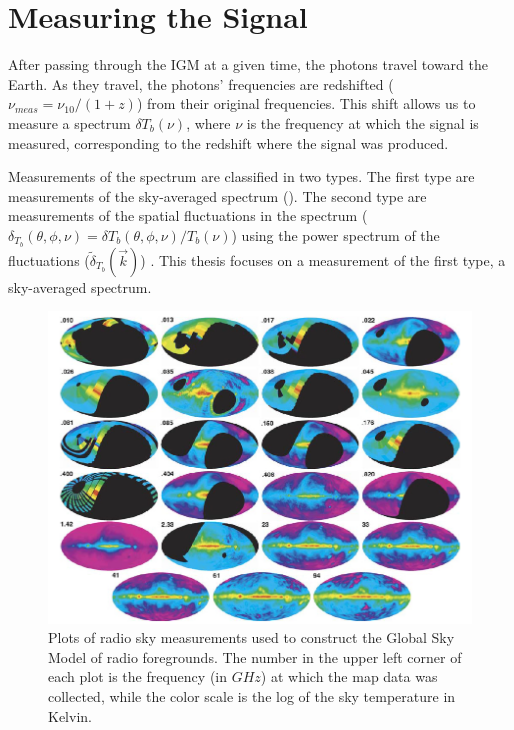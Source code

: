 \section{Measuring the \cm Signal}

After passing through the IGM at a given time, the \cm photons travel toward the Earth. As they travel, the photons' frequencies are redshifted ($\nu_{meas} = \nu_{10}/(1+z)$) from their original frequencies. This shift allows us to measure a spectrum $\delta T_b (\nu)$, where $\nu$ is the frequency at which the signal is measured, corresponding to the redshift where the signal was produced. 

Measurements of the \cm spectrum are classified in two types. The first type are measurements of the sky-averaged spectrum (\avgdtb). The second type are measurements of the spatial fluctuations in the \cm spectrum ($\delta_{T_b} (\theta, \phi, \nu) =  \delta T_b (\theta, \phi, \nu)/ T_b (\nu)$) using the power spectrum of the fluctuations ($ \tilde{\delta}_{T_b} ( \vec{k} )$) \cite{natarajan_2014}. This thesis focuses on a measurement of the first type, a sky-averaged spectrum. 

\begin{figure}[htb]
\begin{center}
\includegraphics[width=0.95\linewidth]{Introduction/figures/GSM_maps.jpg}
\caption{Plots of radio sky measurements used to construct the Global Sky Model \cite{GSM_model} of radio foregrounds. The number in the upper left corner of each plot is the frequency (in $GHz$) at which the map data was collected, while the color scale is the log of the sky temperature in Kelvin.}
\label{Fig:GSM_maps}
\end{center}
\end{figure}


